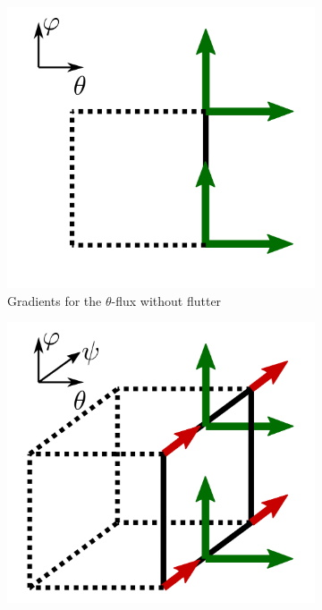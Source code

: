 \begin{figure}[H]\centering
	\begin{subfigure}[t]{0.32\textwidth}
		\centering
		\includegraphics[width=\textwidth]{schemes/Gunter2D.png}
		\caption{ Gradients for the $\theta$-flux without flutter}
		\label{fig:Gunter2D} 
	\end{subfigure}
	\begin{subfigure}[t]{0.32\textwidth}
		\centering
		\includegraphics[width=\textwidth]{schemes/Gunter3D_theta.png}

\end{subfigure}
\end{figure}
